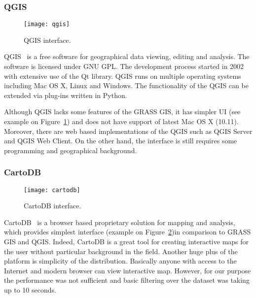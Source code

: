 \subsubsection{QGIS}

\begin{figure}[ht]
  {\par\centering
  \texttt{[image: qgis]}
  \par}
  \caption{QGIS interface.}
  \label{pic:qgis}
\end{figure}

QGIS~\cite{qgis} is a free software for geographical data viewing, editing and analysis. The
software is licensed under GNU GPL. The development process started in 2002 with extensive use of
the Qt library. QGIS runs on multiple operating systems including Mac OS X, Linux and Windows. The
functionality of the QGIS can be extended via plug-ins written in Python.

Although QGIS lacks some features of the GRASS GIS, it has simpler UI (see example on
Figure~\ref{pic:qgis}) and does not have support of latest Mac OS X (10.11). Moreover, there are web
based implementations of the QGIS such as QGIS Server and QGIS Web Client. On the other hand, the
interface is still requires some programming and geographical background.

\subsubsection{CartoDB}

\begin{figure}[ht]
  {\par\centering
  \texttt{[image: cartodb]}
  \par}
  \caption{CartoDB interface.}
  \label{pic:cartodb}
\end{figure}

CartoDB~\cite{cartodb} is a browser based proprietary solution for mapping and analysis, which
provides simplest interface (example on Figure~\ref{pic:cartodb})in comparison to GRASS GIS and
QGIS. Indeed, CartoDB is a great tool for creating interactive maps for the user without particular
background in the field. Another huge plus of the platform is simplicity of the distribution.
Basically anyone with access to the Internet and modern browser can view interactive map. However,
for our purpose the performance was not sufficient and basic filtering over the dataset was taking
up to 10 seconds.

